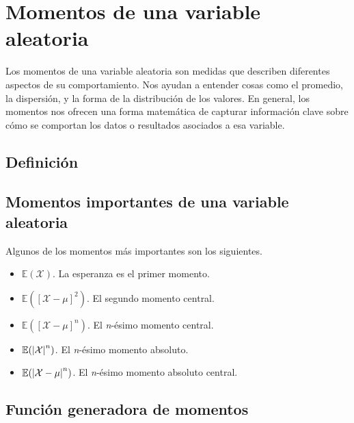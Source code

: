 \section{Momentos de una variable aleatoria}

Los momentos de una variable aleatoria son medidas que describen diferentes aspectos de su comportamiento. Nos ayudan a entender cosas como el promedio, la dispersión, y la forma de la distribución de los valores. En general, los momentos nos ofrecen una forma matemática de capturar información clave sobre cómo se comportan los datos o resultados asociados a esa variable.

\subsection{Definición}

\subsection{Momentos importantes de una variable aleatoria}
Algunos de los momentos más importantes son los siguientes.
\begin{itemize}
  \item $\mathbb E(\mathcal X)$. La esperanza es el primer momento.
  \item $\mathbb E([\mathcal X - \mu]^2)$. El segundo momento central.
  \item $\mathbb E([\mathcal X - \mu]^n)$. El \textit{n}-ésimo momento central.
  \item $\mathbb E(\abs*{\mathcal X}^n)$. El \textit{n}-ésimo momento absoluto.
\item $\mathbb E(\abs*{\mathcal X - \mu}^n)$. El \textit{n}-ésimo momento absoluto central.
\end{itemize}

\subsection{Función generadora de momentos}


